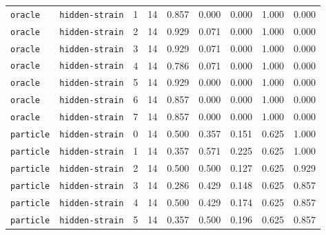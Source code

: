 \documentclass{article}
\begin{document}
\begin{center}
\begin{tabular}{llccccccc}
\texttt{oracle} & \texttt{hidden-strain} & 1 & 14 & 0.857 & 0.000 & 0.000 & 1.000 & 0.000 \\
\texttt{oracle} & \texttt{hidden-strain} & 2 & 14 & 0.929 & 0.071 & 0.000 & 1.000 & 0.000 \\
\texttt{oracle} & \texttt{hidden-strain} & 3 & 14 & 0.929 & 0.071 & 0.000 & 1.000 & 0.000 \\
\texttt{oracle} & \texttt{hidden-strain} & 4 & 14 & 0.786 & 0.071 & 0.000 & 1.000 & 0.000 \\
\texttt{oracle} & \texttt{hidden-strain} & 5 & 14 & 0.929 & 0.000 & 0.000 & 1.000 & 0.000 \\
\texttt{oracle} & \texttt{hidden-strain} & 6 & 14 & 0.857 & 0.000 & 0.000 & 1.000 & 0.000 \\
\texttt{oracle} & \texttt{hidden-strain} & 7 & 14 & 0.857 & 0.000 & 0.000 & 1.000 & 0.000 \\
\texttt{particle} & \texttt{hidden-strain} & 0 & 14 & 0.500 & 0.357 & 0.151 & 0.625 & 1.000 \\
\texttt{particle} & \texttt{hidden-strain} & 1 & 14 & 0.357 & 0.571 & 0.225 & 0.625 & 1.000 \\
\texttt{particle} & \texttt{hidden-strain} & 2 & 14 & 0.500 & 0.500 & 0.127 & 0.625 & 0.929 \\
\texttt{particle} & \texttt{hidden-strain} & 3 & 14 & 0.286 & 0.429 & 0.148 & 0.625 & 0.857 \\
\texttt{particle} & \texttt{hidden-strain} & 4 & 14 & 0.500 & 0.429 & 0.174 & 0.625 & 0.857 \\
\texttt{particle} & \texttt{hidden-strain} & 5 & 14 & 0.357 & 0.500 & 0.196 & 0.625 & 0.857 \\
\bottomrule
\end{tabular}
\end{center}
\end{document}
